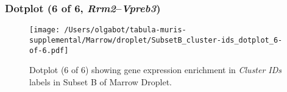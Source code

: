 \clearpage

\subsubsection{Dotplot (6 of 6, \emph{Rrm2}--\emph{Vpreb3})}
\begin{figure}[h]
\centering
\texttt{[image: /Users/olgabot/tabula-muris-supplemental/Marrow/droplet/SubsetB\_cluster-ids\_dotplot\_6-of-6.pdf]}

\caption{ Dotplot (6 of 6)  showing gene expression enrichment in \emph{Cluster IDs} labels in Subset B of Marrow Droplet. }
\end{figure}

